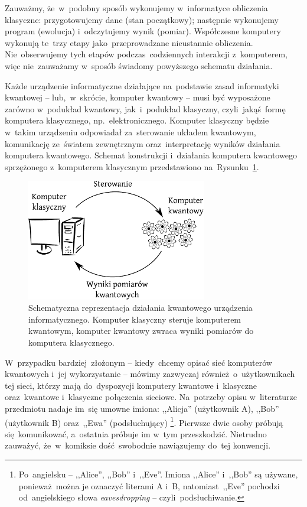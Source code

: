 Zauważmy, że~w~podobny sposób wykonujemy w~informatyce obliczenia klasyczne:
przygotowujemy dane (stan początkowy); następnie wykonujemy program (ewolucja)
i~odczytujemy wynik (pomiar). Współczesne komputery wykonują te~trzy etapy jako~przeprowadzane
nieustannie obliczenia. Nie~obserwujemy tych etapów podczas~codziennych
interakcji z~komputerem, więc nie~zauważamy w~sposób świadomy powyższego schematu
działania.

Każde urządzenie informatyczne działające na~podstawie zasad informatyki
kwantowej -- lub,~w~skrócie,
komputer kwantowy -- musi być wyposażone zarówno w~podukład kwantowy,
jak~i~podukład klasyczny, czyli~jakąś~formę komputera klasycznego,
np.~elektronicznego.
Komputer klasyczny będzie w~takim urządzeniu odpowiadał za~sterowanie układem
kwantowym, komunikację ze~światem zewnętrznym oraz~interpretację wyników
działania komputera kwantowego. Schemat konstrukcji i~działania komputera
kwantowego sprzężonego z~komputerem klasycznym
przedstawiono na~Rysunku~\ref{rys:komputer}.
\begin{figure}
	\centering
	\includegraphics[width=0.7\textwidth]{pics/sterowaniepomiar}
	\caption{Schematyczna reprezentacja działania kwantowego urządzenia informatycznego. Komputer klasyczny steruje
		komputerem kwantowym, komputer kwantowy zwraca wyniki pomiarów do komputera klasycznego.}
	\label{rys:komputer}
\end{figure}

W~przypadku bardziej~złożonym -- kiedy~chcemy opisać sieć komputerów kwantowych
i~jej wykorzystanie -- mówimy zazwyczaj również~o~użytkownikach tej sieci, którzy
mają do~dyspozycji komputery kwantowe i~klasyczne oraz~kwantowe i~klasyczne
połączenia sieciowe. Na~potrzeby opisu w~literaturze przedmiotu nadaje im~się umowne imiona:
,,Alicja'' (użytkownik A), ,,Bob'' (użytkownik B) oraz~,,Ewa'' (podsłuchujący)%
\footnote{Po~angielsku -- ,,Alice'', ,,Bob'' i~,,Eve''. Imiona ,,Alice'' i~,,Bob'' są używane, ponieważ~można
	je oznaczyć literami A i~B, natomiast~,,Eve'' pochodzi od~angielskiego słowa \emph{eavesdropping} -- czyli~podsłuchiwanie.}.
Pierwsze dwie osoby próbują się~komunikować, a~ostatnia próbuje im w~tym przeszkodzić.
Nietrudno zauważyć, że~w~komiksie dość~swobodnie nawiązujemy do~tej konwencji.

